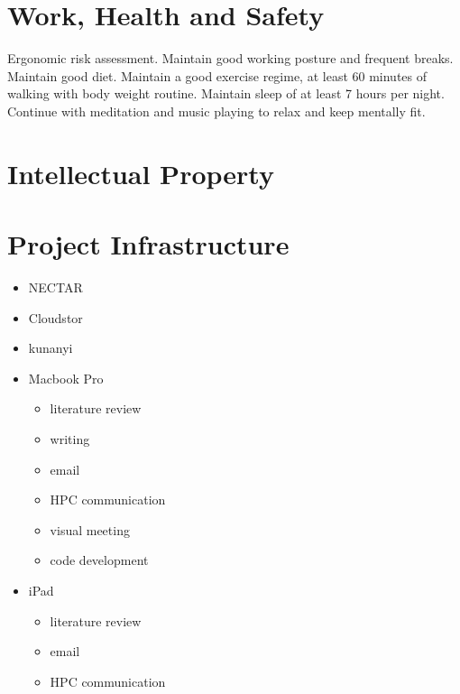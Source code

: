 \documentclass[11pt,a4paper]{article}
\begin{document}
\section*{Work, Health and Safety}
%
Ergonomic risk assessment. Maintain good working posture and frequent breaks. Maintain good diet. Maintain a good exercise regime, at least 60 minutes of walking with body weight routine. Maintain sleep of at least 7 hours per night. Continue with meditation and music playing to relax and keep mentally fit.
\section*{Intellectual Property}
%
\doclicenseThis
\section*{Project Infrastructure}
%
\begin{itemize}
\item NECTAR
\item Cloudstor
\item kunanyi
\item Macbook Pro
  \begin{itemize}
  \item literature review
  \item writing
  \item email
  \item HPC communication
  \item visual meeting
  \item code development
  \end{itemize}
\item iPad
  \begin{itemize}
  \item literature review
  \item email
  \item HPC communication
  \end{itemize}
\end{itemize}
\end{document}
